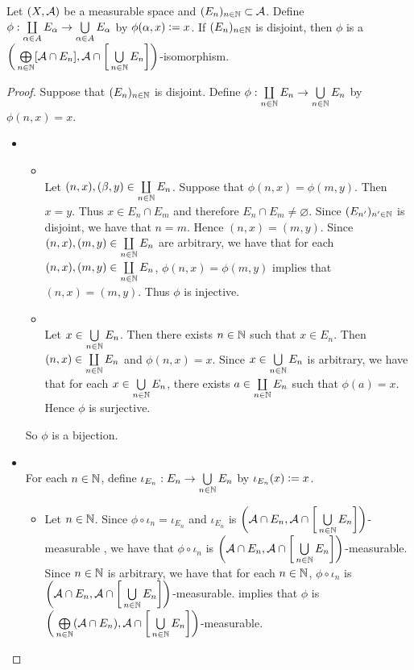 \documentclass{book}
\begin{document}
	\begin{ex} 
		Let $(X, \mathcal{A})$ be a measurable space and $(E_{n})_{n \in \mathbb{N}} \subset \mathcal{A}$. Define $\phi: \coprod\limits_{\alpha \in A} E_{\alpha} \rightarrow \bigcup\limits_{\alpha \in A} E_{\alpha}$ by $\phi(\alpha, x) \vcentcolon= x$. If $(E_{n})_{n \in \mathbb{N}}$ is disjoint, then $\phi$ is a $\bigg( \bigoplus\limits_{n \in \mathbb{N}} [\mathcal{A} \cap E_n], \mathcal{A} \cap \bigg[\bigcup\limits_{n \in \mathbb{N}} E_n \bigg] \bigg)$-isomorphism. 
	\end{ex}
	
	\begin{proof} 
		Suppose that $(E_n)_{n \in \mathbb{N}}$ is disjoint. Define $\phi: \coprod\limits_{n \in \mathbb{N}} E_n \rightarrow \bigcup\limits_{n \in \mathbb{N}} E_n$ by $\phi(n, x) = x$. 
		\begin{itemize}
			\item {} \\
			\begin{itemize}
				\item {} \\
				Let $(n, x), (\beta, y) \in \coprod\limits_{n \in \mathbb{N}} E_n$. Suppose that $\phi(n, x) =  \phi(m, y)$. Then $x = y$. Thus $x \in E_n \cap E_{m}$ and therefore $E_n \cap E_{m} \neq \varnothing$. Since $(E_{n'})_{n' \in \mathbb{N}}$ is disjoint, we have that $n = m$. Hence $(n, x) = (m, y)$. Since $(n, x), (m, y) \in \coprod\limits_{n \in \mathbb{N}} E_n$ are arbitrary, we have that for each $(n, x), (m, y) \in \coprod\limits_{n \in \mathbb{N}} E_n$, $\phi(n, x) =  \phi(m, y)$ implies that $(n, x) = (m, y)$. Thus $\phi$ is injective. 
				\item {} \\
				Let $x \in \bigcup\limits_{n \in \mathbb{N}} E_n$. Then there exists $n \in \mathbb{N}$ such that $x \in E_n$. Then $(n, x) \in \coprod\limits_{n \in \mathbb{N}} E_n$ and $\phi(n, x) = x$. Since $x \in \bigcup\limits_{n \in \mathbb{N}} E_n$ is arbitrary, we have that for each $x \in \bigcup\limits_{n \in \mathbb{N}} E_n$, there exists $a \in \coprod\limits_{n \in \mathbb{N}} E_n$ such that $\phi(a) = x$. Hence $\phi$ is surjective.
			\end{itemize}
			So $\phi$ is a bijection.
			\item {} \\
			For each $n \in \mathbb{N}$, define $\iota_{E_n}: E_n \rightarrow \bigcup\limits_{n \in \mathbb{N}} E_n$ by $\iota_{E_n}(x) \vcentcolon= x$. 
			\begin{itemize}
				\item Let $n \in \mathbb{N}$. Since $\phi \circ \iota_n = \iota_{E_n}$ and $\iota_{E_n}$ is $\bigg( \mathcal{A} \cap E_n, \mathcal{A} \cap \bigg[ \bigcup\limits_{n \in \mathbb{N}} E_n \bigg] \bigg)$-measurable , we have that $\phi \circ \iota_n$ is $\bigg( \mathcal{A} \cap E_n, \mathcal{A} \cap \bigg[ \bigcup\limits_{n \in \mathbb{N}} E_n \bigg] \bigg)$-measurable. Since $n \in \mathbb{N}$ is arbitrary, we have that for each $n \in \mathbb{N}$, $\phi \circ \iota_n$ is $\bigg( \mathcal{A} \cap E_n, \mathcal{A} \cap \bigg[ \bigcup\limits_{n \in \mathbb{N}} E_n \bigg] \bigg)$-measurable.  implies that $\phi$ is $\bigg( \bigoplus\limits_{n \in \mathbb{N}} (\mathcal{A} \cap E_n), \mathcal{A} \cap \bigg[ \bigcup\limits_{n \in \mathbb{N}} E_n \bigg] \bigg)$-measurable. 

\end{itemize}
\end{itemize}
\end{proof}
\end{document}
